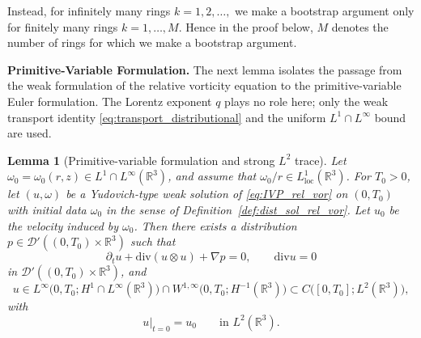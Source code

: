 \documentclass[reqno,11pt]{amsart}
\newtheorem{lemma}[theorem]{Lemma}
\renewcommand{\div}{\mathrm{div}}
\begin{document}
Instead, for infinitely many rings $k=1,2,\ldots,$ we make a bootstrap argument only for finitely many rings $k=1,\ldots,M$. Hence in the proof below, $M$ denotes the number of rings for which we make a bootstrap argument.











\medskip
\noindent\textbf{Primitive-Variable Formulation.}
The next lemma isolates the passage from the weak formulation of the relative vorticity
equation to the primitive-variable Euler formulation. The Lorentz exponent $q$ plays no role
here; only the weak transport identity \eqref{eq:transport_distributional} and the uniform
$L^1\cap L^\infty$ bound are used.

\begin{lemma}[Primitive-variable formulation and strong $L^2$ trace]
\label{lem:weak_to_euler}
Let $\omega_0=\omega_0(r,z)\in L^1\cap L^\infty(\mathbb R^3)$, and assume that $\omega_0/r\in L^1_{\mathrm{loc}}(\mathbb{R}^3)$.
 For $T_0>0$, let
$(u,\omega)$ be a Yudovich-type weak solution of
\eqref{eq:IVP_rel_vor} on $(0,T_0)$ with initial data $\omega_0$ in the  sense of Definition~\ref{def:dist_sol_rel_vor}. Let $u_0$ be the velocity induced by $\omega_0$.
Then there exists a distribution
$p\in\mathcal D'((0,T_0)\times\mathbb R^3)$ such that
\[
\partial_t u+\div (u\otimes u)+\nabla p=0,
\qquad
\div u=0
\]
in $\mathcal D'((0,T_0)\times\mathbb R^3)$, and
\[
u\in L^\infty\!\bigl(0,T_0;H^1\cap L^\infty(\mathbb R^3)\bigr)
\cap W^{1,\infty}\!\bigl(0,T_0;H^{-1}(\mathbb R^3)\bigr)
\subset C\bigl([0,T_0];L^2(\mathbb R^3)\bigr),
\]
with
\[
u|_{t=0}=u_0
\qquad\text{in }L^2(\mathbb R^3).
\]
\end{lemma}
\end{document}
